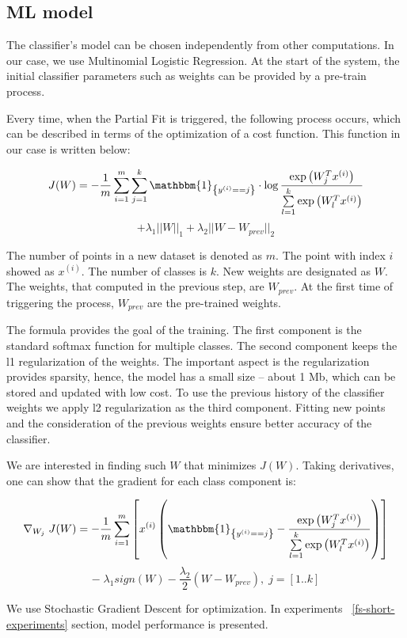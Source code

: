 \subsection{ML model \label{ML}}

The classifier's model can be chosen independently from other computations. In our case, we use Multinomial Logistic Regression. At the start of the system, the initial classifier parameters such as weights can be provided by a pre-train process.

Every time, when the Partial Fit is triggered, the following process occurs, which can be described in terms of the optimization of a cost function. This function in our case is written below:

\begin{center}

$$ J(W) = -\frac{1}{m} \sum \limits_{i = 1}^{m} \sum \limits_{j = 1}^{k} \mathbbm{1}_{\left\{y^{(i)} == j\right\}} \cdot \log \frac{\exp\left({W_{j}^Tx^{(i)}}\right) }{\sum \limits_{l = 1}^{k}  \exp\left({W_{l}^Tx^{(i)}}\right) }$$ 
 $$ +  \lambda_1 ||W||_1 + \lambda_2 ||W - W_{prev}||_2 $$

\end{center} 

The number of points in a new dataset is denoted as $m$. The point with index $i$ showed as $x^{(i)}$. The number of classes is $k$. New weights are designated as $W$. The weights, that computed in the previous step, are $W_{prev}$. At the first time of triggering the process, $W_{prev}$ are the pre-trained weights. 

The formula provides the goal of the training. The first component is the standard softmax function for multiple classes. The second component keeps the l1 regularization of the weights. The important aspect is the regularization provides sparsity, hence, the model has a small size -- about 1 Mb, which can be stored and updated with low cost. To use the previous history of the classifier weights we apply l2 regularization as the third component. Fitting new points and the consideration of the previous weights ensure better accuracy of the classifier.

We are interested in finding such $W$ that minimizes $J(W)$. Taking derivatives, one can show that the gradient for each class component is:

\begin{center}

$$ \nabla_{W_j} \; J(W) = -\frac{1}{m} \sum \limits_{i = 1}^{m} \left[ x^{(i)} \left( \mathbbm{1}_{\left\{y^{(i)} == j\right\} } - \frac{\exp\left({W_{j}^Tx^{(i)}}\right)}{\sum \limits_{l = 1}^{k}  \exp\left({W_{l}^Tx^{(i)}}\right)} \right) \right] $$
$$ - \; \lambda_1 sign\left(W\right) - \frac{\lambda_2}{2} \left(W - W_{prev} \right), \; j = [1..k] $$

\end{center} 

We use Stochastic Gradient Descent for optimization. In experiments ~\ref{fs-short-experiments} section, model performance is presented.